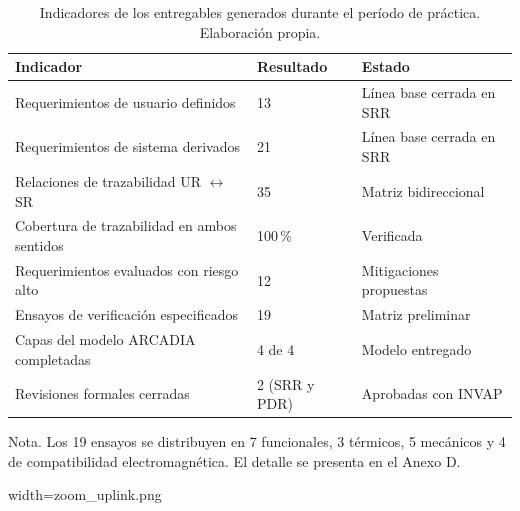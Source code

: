 \begin{table}[H]
\centering
\begin{threeparttable}
\caption{Indicadores de los entregables generados durante el período de
práctica. Elaboración propia.\vspace{1ex}}
\small
\begin{tabularx}{\textwidth}{@{}X l l@{}}
\toprule
\textbf{Indicador} & \textbf{Resultado} & \textbf{Estado} \\
\midrule
Requerimientos de usuario definidos                       & 13    & Línea base cerrada en SRR \\
Requerimientos de sistema derivados                       & 21    & Línea base cerrada en SRR \\
Relaciones de trazabilidad UR $\leftrightarrow$ SR        & 35    & Matriz bidireccional \\
Cobertura de trazabilidad en ambos sentidos               & 100\,\% & Verificada \\
Requerimientos evaluados con riesgo alto                  & 12    & Mitigaciones propuestas \\
Ensayos de verificación especificados                     & 19    & Matriz preliminar \\
Capas del modelo ARCADIA completadas                      & 4 de 4 & Modelo entregado \\
Revisiones formales cerradas                              & 2 (SRR y PDR) & Aprobadas con INVAP \\
\bottomrule
\end{tabularx}
\begin{tablenotes}[flushleft]\footnotesize
\item Nota. Los 19 ensayos se distribuyen en 7 funcionales, 3 térmicos, 5
mecánicos y 4 de compatibilidad electromagnética. El detalle se presenta en el
Anexo D.
\end{tablenotes}
\end{threeparttable}
\end{table}


%
{width=\textwidth}{zoom_uplink.png}

